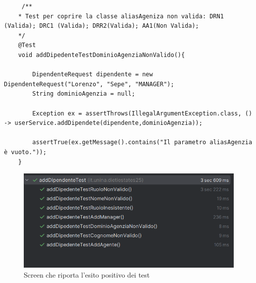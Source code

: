 \begin{lstlisting}
	 /**
	* Test per coprire la classe aliasAgeniza non valida: DRN1 (Valida); DRC1 (Valida); DRR2(Valida); AA1(Non Valida);
	*/
	@Test
	void addDipedenteTestDominioAgenziaNonValido(){
		
		DipendenteRequest dipendente = new DipendenteRequest("Lorenzo", "Sepe", "MANAGER");
		String dominioAgenzia = null;
		
		Exception ex = assertThrows(IllegalArgumentException.class, () -> userService.addDipendete(dipendente,dominioAgenzia));
		
		assertTrue(ex.getMessage().contains("Il parametro aliasAgenzia è vuoto."));
	}
\end{lstlisting}

\begin{figure}[H]
	\centering
	\includegraphics[width=0.7\linewidth]{Immagini/unit test/esitiTestAddDipendente.png}
	\caption[Esito test]{Screen che riporta l'esito positivo dei test}
\end{figure}
